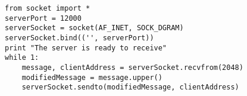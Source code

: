 \documentclass[varwidth=35em,crop]{standalone}
\begin{document}
\begin{verbatim}
from socket import *
serverPort = 12000
serverSocket = socket(AF_INET, SOCK_DGRAM)
serverSocket.bind(('', serverPort))
print "The server is ready to receive"
while 1:
    message, clientAddress = serverSocket.recvfrom(2048)
    modifiedMessage = message.upper()
    serverSocket.sendto(modifiedMessage, clientAddress)
\end{verbatim}
\end{document}
